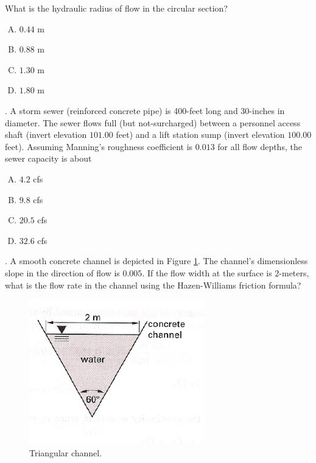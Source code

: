 \documentclass[12 pt]{article}
\begin{document}
What is the hydraulic radius of flow in the circular section?
\begin{enumerate} [(A)]
\item $0.44$ m
\item $0.88$ m
\item $1.30$ m
\item $1.80$ m
\end{enumerate}
. A storm sewer (reinforced concrete pipe) is 400-feet long and 30-inches in diameter.  The sewer flows full (but not-surcharged) between a personnel access shaft (invert elevation $101.00$ feet) and a lift station sump (invert elevation $100.00$ feet).  Assuming Manning's roughness coefficient is $0.013$ for all flow depths, the sewer capacity is about
\begin{enumerate} [(A)]
\item  $4.2$ cfs
\item  $9.8$ cfs
\item  $20.5$ cfs
\item  $32.6$ cfs
\end{enumerate}
. A smooth concrete channel is depicted in Figure \ref{fig:TriangleChannel}.  The channel's dimensionless slope in the direction of flow is $0.005$.  If the flow width at the surface is $2$-meters, what is the flow rate in the channel using the Hazen-Williams friction formula?

\begin{figure}[h!] %
\centering
   \includegraphics[width=3in]{TriangleChannel.png}
   \caption{Triangular channel.}
   \label{fig:TriangleChannel} 
\end{figure}
\end{document}
